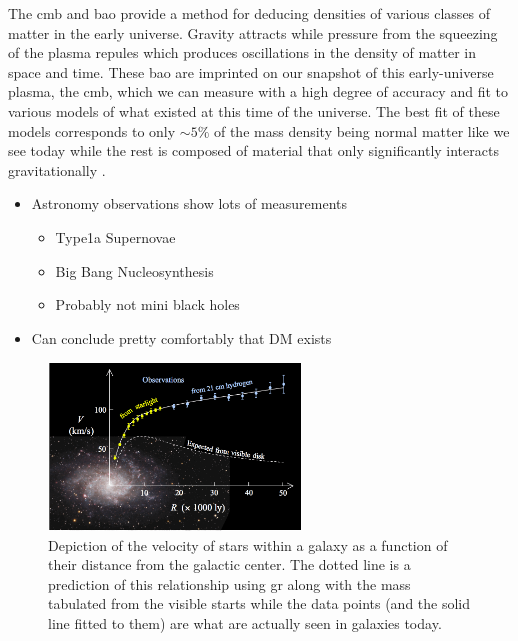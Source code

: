 The \gls{cmb} and \gls{bao} provide a method for deducing densities of various classes of matter
in the early universe. Gravity attracts while pressure from the squeezing of the plasma repules
which produces oscillations in the density of matter in space and time. These \gls{bao} are
imprinted on our snapshot of this early-universe plasma, the \gls{cmb}, which we can measure with
a high degree of accuracy and fit to various models of what existed at this time of the universe.
The best fit of these models corresponds to only $\sim 5\%$ of the mass density being normal matter
like we see today while the rest is composed of material that only significantly
interacts gravitationally \cite{planck-cmb-2015}.

\begin{itemize}
      \item Astronomy observations show lots of measurements
            \begin{itemize}
                  \item Type1a Supernovae \cite{type1a-supernova-2010}
                  \item Big Bang Nucleosynthesis \cite{nucleosynthesis-1998}
                  \item Probably not mini black holes \cite{constraints-primordial-black-holes-2021}
            \end{itemize}
      \item Can conclude pretty comfortably that DM exists
\end{itemize}

\begin{figure}
      \centering
      \includegraphics[width=0.6\textwidth]{figures/theory/rotation-curve-evidence-for-dm.png}
      \caption{
            Depiction of the velocity of stars within a galaxy as a function of their distance
            from the galactic center. The dotted line is a prediction of this relationship using
            \gls{gr} along with the mass tabulated from the visible starts while the data points
            (and the solid line fitted to them) are what are actually seen in galaxies today.
      }
      \label{fig:rotation-curve}
\end{figure}


